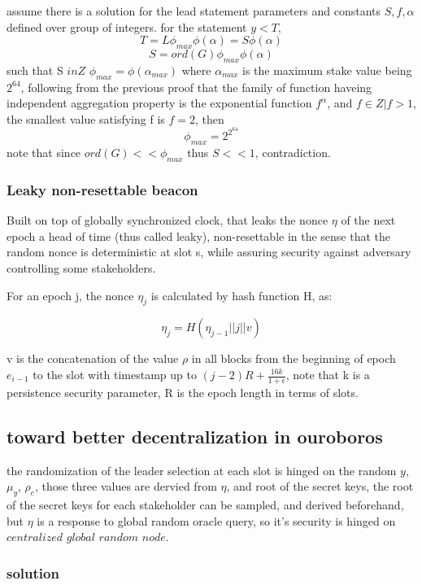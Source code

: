 \documentclass[a4paper]{article}
\begin{document}
assume there is a solution for the lead statement parameters and constants $S, f, \alpha$ defined over group of integers.
for the statement $y<T$, $$T=L\phi_{max}\phi(\alpha)=S\phi(\alpha)$$
$$S=ord(G)\phi_{max}\phi(\alpha)$$
such that S $in Z$
$\phi_{max}=\phi(\alpha_{max})$ where $\alpha_{max}$ is the maximum stake value being $2^{64}$, following from the previous proof that the family of function haveing independent aggregation property is the exponential function $f^\alpha$, and $f \in Z | f>1$, the smallest value satisfying f is $f=2$, then $$\phi_{max} = 2^{2^{64}}$$
note that since $ord(G)<<\phi_{max}$ thus $S<<1$, contradiction.


\subsubsection{ Leaky non-resettable beacon}

Built on top of globally synchronized clock, that leaks the nonce $\eta$
of the next epoch a head of time (thus called leaky), non-resettable
in the sense that the random nonce is deterministic at slot s, while
assuring security against adversary controlling some stakeholders.

For an epoch j, the nonce $\eta_j$ is calculated by hash function H, as:

$$\eta_j = H(\eta_{j-1}||j||v)$$

v is the concatenation of the value $\rho$ in all blocks from the
beginning of epoch $e_{i-1}$ to the slot with timestamp up to $(j-2)R +
\frac{16k}{1+\epsilon}$, note that k is a persistence security parameter,
R is the epoch length in terms of slots.

\subsection {toward better decentralization in ouroboros}

the randomization of the leader selection at each slot is hinged on the random $y$, $\mu_y$, $\rho_c$, those three values are dervied from $\eta$, and root of the secret keys, the root of the secret keys for each stakeholder can be sampled, and derived beforehand, but $\eta$ is a response to global random oracle query, so it's security is hinged on $\textit{centralized global random node}$.

\subsubsection{ solution}
\end{document}
